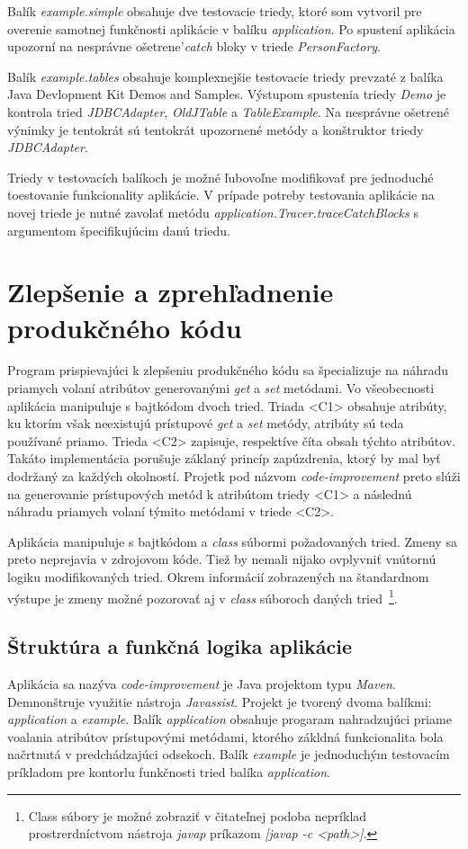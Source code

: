 \documentclass[11pt,final,oneside]{fithesis}
\begin{document}
Balík \textit{example.simple} obsahuje dve testovacie triedy, ktoré som vytvoril pre overenie samotnej funkčnosti aplikácie v balíku \textit{application}. Po spustení aplikácia upozorní na nesprávne ošetrene'\textit{catch} bloky v triede \textit{PersonFactory}.

Balík \textit{example.tables} obsahuje komplexnejšie testovacie triedy prevzaté z balíka Java Devlopment Kit Demos and Samples. Výstupom spustenia triedy \textit{Demo} je kontrola tried \textit{JDBCAdapter}, \textit{OldJTable} a \textit{TableExample}. Na nesprávne ošetrené výnimky je tentokrát sú tentokrát upozornené metódy a konštruktor triedy \textit{JDBCAdapter}.

Triedy v testovacích balíkoch je možné ľubovoľne modifikovať pre jednoduché toestovanie funkcionality aplikácie. V prípade potreby testovania aplikácie na novej triede je nutné zavolať metódu \textit{application.Tracer.traceCatchBlocks} s argumentom špecifikujúcim danú triedu.

\section{Zlepšenie a zprehľadnenie produkčného kódu}

Program prispievajúci k zlepšeniu produkčného kódu sa špecializuje na náhradu priamych volaní atribútov generovanými \textit{get} a \textit{set} metódami. Vo všeobecnosti aplikácia manipuluje s bajtkódom dvoch tried. Triada <C1> obsahuje atribúty, ku ktorím však neexistujú prístupové \textit{get} a \textit{set} metódy, atribúty sú teda používané priamo. Trieda <C2> zapisuje, respektíve číta obsah týchto atribútov. Takáto implementácia porušuje záklaný princíp zapúzdrenia, ktorý by mal byť dodržaný za každých okolností. Projetk pod názvom \textit{code-improvement} preto slúži na generovanie prístupových metód k atribútom triedy <C1> a následnú náhradu priamych volaní týmito metódami v triede <C2>.

Aplikácia manipuluje s bajtkódom a \textit{class} súbormi požadovaných tried. Zmeny sa preto neprejavia v zdrojovom kóde. Tiež by nemali nijako ovplyvniť vnútornú logiku modifikovaných tried. Okrem informácií zobrazených na štandardnom výstupe je zmeny možné pozorovať aj v \textit{class} súboroch daných tried~\footnote{Class súbory je možné zobraziť v čitateľnej podoba nepríklad prostrerdníctvom nástroja \textit{javap} príkazom \textit{[javap -c <path>]}.}.

\subsection{Štruktúra a funkčná logika aplikácie}
Aplikácia sa nazýva \textit{code-improvement} je Java projektom typu \textit{Maven}. Demnonštruje využitie nástroja \textit{Javassist}. Projekt je tvorený dvoma balíkmi: \textit{application} a \textit{example}. Balík \textit{application} obsahuje progaram nahradzujúci priame voalania atribútov prístupovými metódami, ktorého zákldná funkcionalita bola načrtnutá v predchádzajúci odsekoch. Balík \textit{example} je jednoduchým testovacím príkladom pre kontorlu funkčnosti tried balíka \textit{application}.
\end{document}
